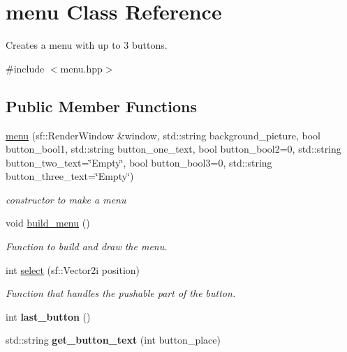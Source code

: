 \hypertarget{classmenu}{}\section{menu Class Reference}
\label{classmenu}


Creates a menu with up to 3 buttons.  




{\ttfamily \#include $<$menu.\+hpp$>$}

\subsection*{Public Member Functions}
\begin{DoxyCompactItemize}
\item 
\hyperlink{classmenu_a1c6f1319ba2123f9654df695725e83b4}{menu} (sf\+::\+Render\+Window \&window, std\+::string background\+\_\+picture, bool button\+\_\+bool1, std\+::string button\+\_\+one\+\_\+text, bool button\+\_\+bool2=0, std\+::string button\+\_\+two\+\_\+text=\char`\"{}Empty\char`\"{}, bool button\+\_\+bool3=0, std\+::string button\+\_\+three\+\_\+text=\char`\"{}Empty\char`\"{})
\begin{DoxyCompactList}\small\item\em constructor to make a menu \end{DoxyCompactList}\item 
void \hyperlink{classmenu_a8d194b462b1b180086e5b06a2dbfbdff}{build\+\_\+menu} ()
\begin{DoxyCompactList}\small\item\em Function to build and draw the menu. \end{DoxyCompactList}\item 
int \hyperlink{classmenu_a06744d58a2aad693d3637d0485aa7984}{select} (sf\+::\+Vector2i position)
\begin{DoxyCompactList}\small\item\em Function that handles the pushable part of the button. \end{DoxyCompactList}\item 
\mbox{\label{classmenu_ab572ef3baf462b15322e37278d81494c}} 
int {\bfseries last\+\_\+button} ()
\item 
\mbox{\label{classmenu_aa4b8f6e9c87b8fa413a830af33429c85}} 
std\+::string {\bfseries get\+\_\+button\+\_\+text} (int button\+\_\+place)
\end{DoxyCompactItemize}



